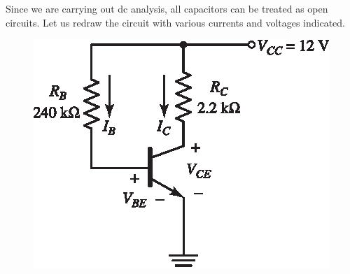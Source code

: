 \begin{solution}
Since we are carrying out dc analysis, all capacitors can be treated as open circuits. Let us redraw the circuit with various currents and voltages indicated.
\begin{figure}[H]
\centering
\includegraphics{chap3/S3-EE-03-IN009.eps}
\end{figure}

\eject

~\phantom{a}
\vskip -1cm


\end{solution}
